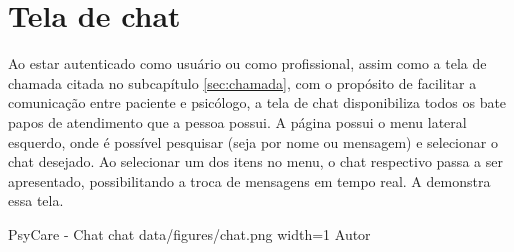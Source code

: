 \section{Tela de chat}
\label{sec:chat}

Ao estar autenticado como usuário ou como profissional, assim como a tela de chamada citada no subcapítulo \ref{sec:chamada}, com o propósito de facilitar a comunicação entre paciente e psicólogo, a tela de chat disponibiliza todos os bate papos de atendimento que a pessoa possui. A página possui o menu lateral esquerdo, onde é possível pesquisar (seja por nome ou mensagem) e selecionar o chat desejado. Ao selecionar um dos itens no menu, o chat respectivo passa a ser apresentado, possibilitando a troca de mensagens em tempo real. A  demonstra essa tela.

\image
    {PsyCare - Chat}
    {chat}
    {data/figures/chat.png}
    {width=1\textwidth}
    {Autor}
